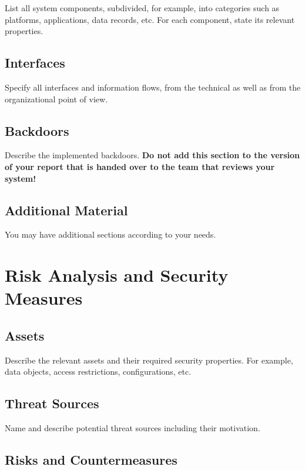 \documentclass{article}
\begin{document}
List all system components, subdivided, for example, into
  categories such as platforms, applications, data records, etc. For
  each component, state its relevant properties.


\subsection{Interfaces}

Specify  all interfaces and  information flows, from the technical as well as from the
  organizational point of view.

\subsection{Backdoors}

Describe the implemented backdoors. {\bfseries Do not add
    this section to the version of your report that is handed over to
    the team that reviews your system!}

\subsection{Additional Material}

You may have additional sections according to your needs.


\section{Risk Analysis and Security Measures}

\subsection{Assets}

Describe the relevant assets and their required security
  properties. For example, data objects, access restrictions,
  configurations, etc.

\subsection{Threat Sources}

Name and describe potential threat sources including their motivation.

\subsection{Risks and Countermeasures}
\end{document}
